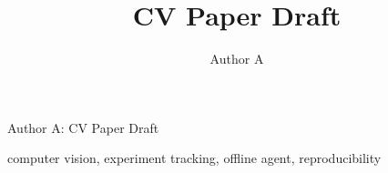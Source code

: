 \documentclass[lettersize,journal]{IEEEtran}
\begin{document}
\title{CV Paper Draft}
\author{Author A}

%
{Author A: CV Paper Draft}

\maketitle



\begin{IEEEkeywords}
computer vision, experiment tracking, offline agent, reproducibility
\end{IEEEkeywords}







\end{document}
